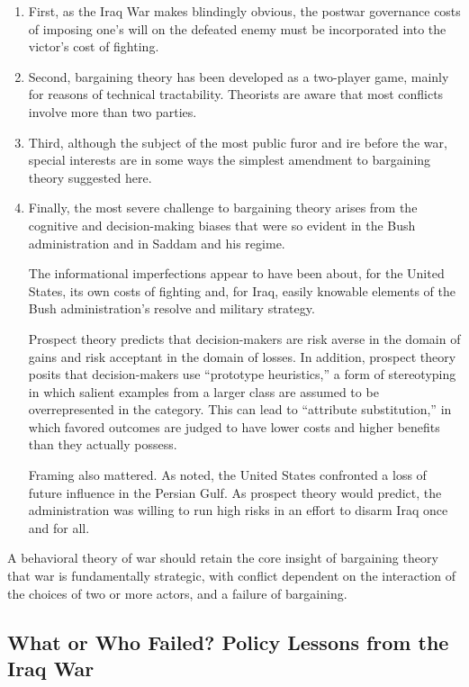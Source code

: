 \begin{enumerate}
    \item First, as the Iraq War makes blindingly obvious, the postwar governance costs of imposing one's will on the defeated enemy must be incorporated into the victor's cost of fighting.

    \item Second, bargaining theory has been developed as a two-player game, mainly for reasons of technical tractability. Theorists are aware that most conflicts involve more than two parties.

    \item Third, although the subject of the most public furor and ire before the war, special interests are in some ways the simplest amendment to bargaining theory suggested here.

    \item Finally, the most severe challenge to bargaining theory arises from the cognitive and decision-making biases that were so evident in the Bush administration and in Saddam and his regime.

    The informational imperfections appear to have been about, for the United States, its own costs of fighting and, for Iraq, easily knowable elements of the Bush administration's resolve and military strategy.

    Prospect theory predicts that decision-makers are risk averse in the domain of gains and risk acceptant in the domain of losses. In addition, prospect theory posits that decision-makers use ``prototype heuristics,'' a form of stereotyping in which salient examples from a larger class are assumed to be overrepresented in the category. This can lead to ``attribute substitution,'' in which favored outcomes are judged to have lower costs and higher benefits than they actually possess.

    Framing also mattered. As noted, the United States confronted a loss of future influence in the Persian Gulf. As prospect theory would predict, the administration was willing to run high risks in an effort to disarm Iraq once and for all.
\end{enumerate}

A behavioral theory of war should retain the core insight of bargaining theory that war is fundamentally strategic, with conflict dependent on the interaction of the choices of two or more actors, and a failure of bargaining.

\subsection{What or Who Failed? Policy Lessons from the Iraq War}

